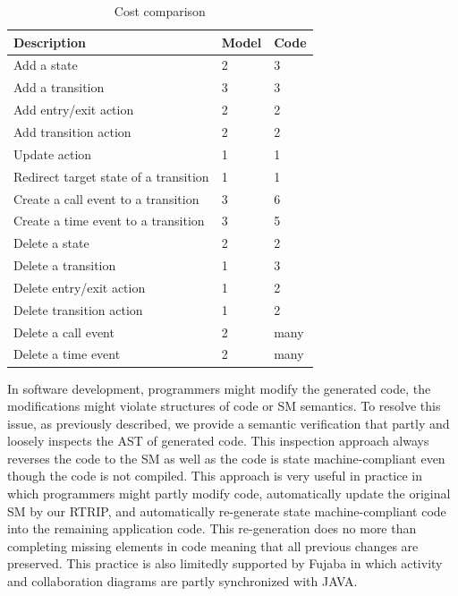 \begin{table}
\centering
\caption{Cost comparison}
\label{table:cost}
\begin{tabular}{|l|l|l|}
\hline
Description                                     & Model & Code \\ \hline
Add a state                                     & 2     & 3    \\ \hline
Add a transition                                & 3     & 3    \\ \hline
Add entry/exit action                           & 2     & 2    \\ \hline
Add transition action                           & 2     & 2    \\ \hline
Update action                                   & 1     & 1    \\ \hline
Redirect target state of a transition           & 1     & 1    \\ \hline
Create a call event to a transition & 3     & 6    \\ \hline
Create a time event to a transition & 3     & 5    \\ \hline
Delete a state                                  & 2     & 2    \\ \hline
Delete a transition                             & 1     & 3    \\ \hline
Delete entry/exit action                        & 1     & 2    \\ \hline
Delete transition action                        & 1     & 2    \\ \hline
Delete a call event                             & 2     & many \\ \hline
Delete a time event                             & 2     & many \\ \hline
\end{tabular}
\end{table}

In software development, programmers might modify the generated code, the modifications might violate structures of code or SM semantics. To resolve this issue, as previously described, we provide a semantic verification that partly and loosely inspects the AST of generated code. This inspection approach always reverses the code to the SM as well as the code is state machine-compliant even though the code is not compiled. This approach is very useful in practice in which programmers might partly modify code, automatically update the original SM by our RTRIP, and automatically re-generate state machine-compliant code into the remaining application code. This re-generation does no more than completing missing elements in code meaning that all previous changes are preserved. This practice is also limitedly supported by Fujaba \cite{KNNZ99_2_ag} in which activity and collaboration diagrams are partly synchronized with JAVA.



